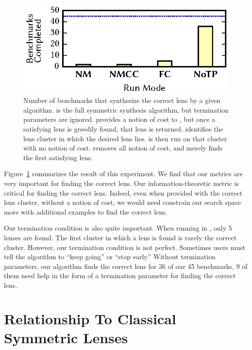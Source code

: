 \documentclass[acmsmall,screen,anonymous]{acmart}
\begin{document}
\begin{figure}
  \includegraphics{generated-graphs/metrics_importance}
  \caption{Number of benchmarks that synthesize the correct lens by a given
    algorithm. \NoTPOpt{} is the full symmetric synthesis algorithm, but
    termination parameters are ignored. \FCOpt{} provides a notion of cost to
    \GreedySynth, but once a satisfying lens is greedily found, that lens is
    returned. \NMCCOpt{} identifies the lens cluster in which the desired 
    lens lies.  \GreedySynth{} is then run on that cluster with no notion of
    cost. \NMOpt{} removes all notion of cost, and merely finds the first
    satisfying lens.} 
  \label{fig:metric}
\end{figure}

Figure~\ref{fig:metric} summarizes the result of this experiment. We find that
our metrics are very important for finding the correct lens. Our
information-theoretic metric is critical for finding the correct lens. Indeed,
even when provided with the correct lens cluster, without a notion of cost, we
would need constrain our search space more with additional examples to find the
correct lens.

Our termination condition is also quite important. When running in \FCOpt{},
only 5 lenses are found. The first cluster in which a lens is found is rarely
the correct cluster. However, our termination condition is not perfect.
Sometimes users must tell the algorithm to ``keep going'' or ``stop early.''
Without termination parameters, our algorithm finds the correct lens for 36 of
our 45 benchmarks, 9 of them need help in the form of a termination parameter
for finding the correct lens.

\section{Relationship To Classical Symmetric Lenses}
\label{sec:relationship}
\end{document}
